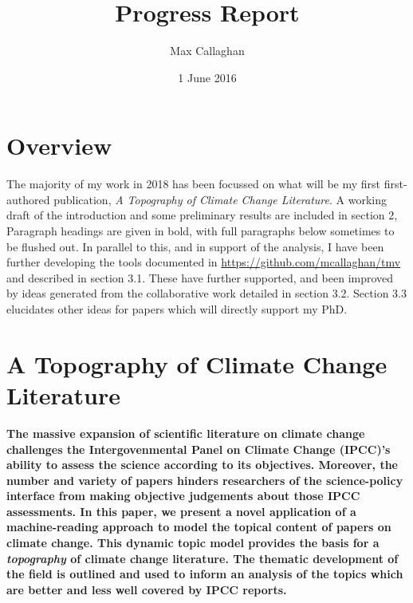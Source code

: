 \documentclass{article}
\title{Progress Report}
\author{Max Callaghan}
\date{1 June 2016}
\makeatletter
\renewcommand{\maketitle}{\bgroup\setlength{\parindent}{0pt}
	\begin{flushleft}
		
		{\huge\textbf{\@title}}
		
		\bigskip
		
		{\large\textbf{\@author}}
		
		\bigskip
		
		{\large\textbf{\@date}}
		
		
	\end{flushleft}\egroup
}
\makeatother
\begin{document}
	\maketitle
	
\section{Overview}

The majority of my work in 2018 has been focussed on what will be my first first-authored publication, \textit{A Topography of Climate Change Literature}. A working draft of the introduction and some preliminary results are included in section 2, Paragraph headings are given in bold, with full paragraphs below sometimes to be flushed out. In parallel to this, and in support of the analysis, I have been further developing the tools documented in \url{https://github.com/mcallaghan/tmv} and described in section 3.1. These have further supported, and been improved by ideas generated from the collaborative work detailed in section 3.2. Section 3.3 elucidates other ideas for papers which will directly support my PhD.

%

\section{A Topography of Climate Change Literature}

\noindent\textbf{	
	The massive expansion of scientific literature on climate change challenges the Intergovenmental Panel on Climate Change (IPCC)'s ability to assess the science according to its objectives. 
	Moreover, the number and variety of papers hinders researchers of the science-policy interface from making objective judgements about those IPCC assessments. In this paper, we present a novel application of a machine-reading approach to model the topical content of papers on climate change. This dynamic topic model provides the basis for a \textit{topography} of climate change literature. The thematic development of the field is outlined and used to inform an analysis of the topics which are better and less well covered by IPCC reports.
}
\end{document}
